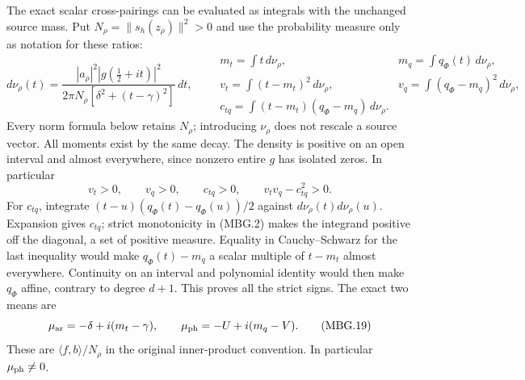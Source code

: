 The exact scalar cross-pairings can be evaluated as integrals with the
unchanged source mass. Put \(N_\rho=\|s_h(z_\rho)\|^2>0\) and use the
probability measure only as notation for these ratios:
\[
 d\nu_\rho(t)=
 \frac{|a_\rho|^2|g(\tfrac12+it)|^2}
 {2\pi N_\rho[\delta^2+(t-\gamma)^2]}\,dt,\qquad
 \begin{array}{ll}
 m_t=\int t\,d\nu_\rho,&m_q=\int q_\Phi(t)\,d\nu_\rho,\\
 v_t=\int(t-m_t)^2\,d\nu_\rho,&
 v_q=\int(q_\Phi-m_q)^2\,d\nu_\rho,\\
 c_{tq}=\int(t-m_t)(q_\Phi-m_q)\,d\nu_\rho .
 \end{array}
 \tag{MBG.17}\label{GraphV2:eq:mbg-terminal-moments}
\]
Every norm formula below retains \(N_\rho\); introducing \(\nu_\rho\)
does not rescale a source vector. All moments exist by the same decay.
The density is positive on an open interval and almost everywhere,
since nonzero entire \(g\) has isolated zeros. In particular
\[
 v_t>0,\qquad v_q>0,\qquad c_{tq}>0,\qquad
 v_tv_q-c_{tq}^2>0.
 \tag{MBG.18}\label{GraphV2:eq:mbg-strict-covariance}
\]
For \(c_{tq}\), integrate
\((t-u)(q_\Phi(t)-q_\Phi(u))/2\) against
\(d\nu_\rho(t)d\nu_\rho(u)\). Expansion gives \(c_{tq}\);
strict monotonicity in (MBG.2) makes the integrand positive off the
diagonal, a set of positive measure. Equality in Cauchy--Schwarz for
the last inequality would make \(q_\Phi(t)-m_q\) a scalar multiple of
\(t-m_t\) almost everywhere. Continuity on an interval and polynomial
identity would then make \(q_\Phi\) affine, contrary to degree \(d+1\).
This proves all the strict signs.
The exact two means are
\[
 \mu_{\rm ar}=-\delta+i(m_t-\gamma),\qquad
 \mu_{\rm ph}=-U+i(m_q-V).
 \tag{MBG.19}\label{GraphV2:eq:mbg-means}
\]
These are \(\langle f,b\rangle/N_\rho\) in the original inner-product
convention. In particular \(\mu_{\rm ph}\ne0\).

